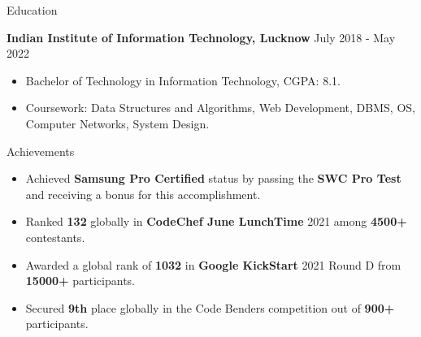 \documentclass{resume} %
\begin{document}
\begin{rSection}{Education}

{\bf Indian Institute of Information Technology, Lucknow} \hfill {July 2018 - May 2022} \\
    \itemsep -3pt {}
    \vspace{-5pt} %
\begin{itemize}
    \item Bachelor of Technology in Information Technology, CGPA: 8.1. \\
    \vspace{-3pt} %
    \item Coursework: Data Structures and Algorithms, Web Development, DBMS, OS, Computer Networks, System Design. \\
\end{itemize}

\end{rSection}

 \vspace{-5pt}
\begin{rSection}{Achievements} 
\begin{itemize}
\vspace{3pt}
    \item Achieved \textbf{Samsung Pro Certified} status by passing the \textbf{SWC Pro Test} and receiving a bonus for this accomplishment.
    \item Ranked \textbf{132} globally in \textbf{CodeChef June LunchTime} 2021 among \textbf{4500+} contestants.
    \vspace{-3pt} %
    \item Awarded a global rank of \textbf{1032} in \textbf{Google KickStart} 2021 Round D from \textbf{15000+} participants.
    \vspace{-3pt} %
    \item Secured \textbf{9th} place globally in the Code Benders competition out of \textbf{900+} participants.
    \vspace{-3pt} %
\end{itemize}
\end{rSection}
\end{document}
